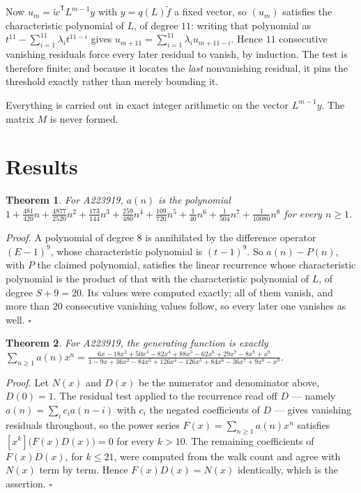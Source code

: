 \documentclass[11pt]{article}
\newtheorem{theorem}{Theorem}
\theoremstyle{definition}
\begin{document}
Now $u_m = \tilde w^{\mathsf T} L^{m-1} y$ with $y = q(L)\tilde f$ a fixed vector, so $(u_m)$ satisfies the characteristic polynomial of $L$, of degree $11$: writing that polynomial as $t^{11} - \sum_{i=1}^{11} \lambda_i t^{11-i}$ gives $u_{m+11} = \sum_{i=1}^{11} \lambda_i u_{m+11-i}$. Hence $11$ consecutive vanishing residuals force every later residual to vanish, by induction. The test is therefore finite; and because it locates the {\itshape last} nonvanishing residual, it pins the threshold exactly rather than merely bounding it.

Everything is carried out in exact integer arithmetic on the vector $L^{m-1}y$. The matrix $M$ is never formed.

\section{Results}

\begin{theorem} For A223919, $a(n)$ is the polynomial $1 + \frac{481}{420}n + \frac{4877}{2520}n^{2} + \frac{173}{144}n^{3} + \frac{259}{480}n^{4} + \frac{109}{720}n^{5} + \frac{1}{40}n^{6} + \frac{1}{504}n^{7} + \frac{1}{10080}n^{8}$ for every $n \ge 1$.\end{theorem}

{\itshape Proof.} A polynomial of degree $8$ is annihilated by the difference operator $(E-1)^{9}$, whose characteristic polynomial is $(t-1)^{9}$. So $a(n) - P(n)$, with $P$ the claimed polynomial, satisfies the linear recurrence whose characteristic polynomial is the product of that with the characteristic polynomial of $L$, of degree $S + 9 = 20$. Its values were computed exactly; all of them vanish, and more than $20$ consecutive vanishing values follow, so every later one vanishes as well. $\square$

\begin{theorem} For A223919, the generating function is exactly $\sum_{n\ge 1} a(n)x^n = \frac{6x - 18x^{2} + 50x^{3} - 82x^{4} + 88x^{5} - 62x^{6} + 29x^{7} - 8x^{8} + x^{9}}{1 - 9x + 36x^{2} - 84x^{3} + 126x^{4} - 126x^{5} + 84x^{6} - 36x^{7} + 9x^{8} - x^{9}}$.\end{theorem}

{\itshape Proof.} Let $N(x)$ and $D(x)$ be the numerator and denominator above, $D(0)=1$. The residual test applied to the recurrence read off $D$ --- namely $a(n) = \sum_i c_i a(n-i)$ with $c_i$ the negated coefficients of $D$ --- gives vanishing residuals throughout, so the power series $F(x)=\sum_{n\ge 1}a(n)x^n$ satisfies $[x^k]\bigl(F(x)D(x)\bigr) = 0$ for every $k > 10$. The remaining coefficients of $F(x)D(x)$, for $k \le 21$, were computed from the walk count and agree with $N(x)$ term by term. Hence $F(x)D(x) = N(x)$ identically, which is the assertion. $\square$
\end{document}
